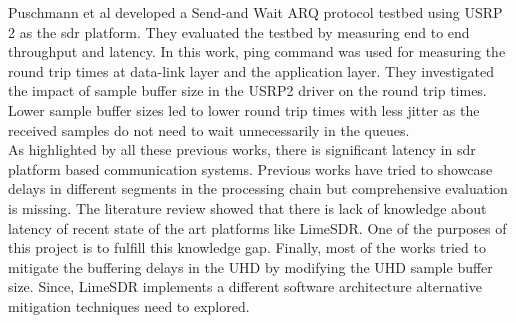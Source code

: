  
Puschmann et al \cite{puschmann_implementation_2011} developed a Send-and Wait \ac{ARQ} protocol  testbed using USRP 2 as the \ac{sdr} platform.
They evaluated the testbed by measuring end to end throughput and latency.
In this work, ping command was used for measuring the round trip times at data-link layer and the application layer.
They investigated the impact of sample buffer size in the USRP2 driver on the round trip times.
Lower sample buffer sizes led to lower round trip times with less jitter as the received samples do not need to wait unnecessarily in the queues.\\

As highlighted by all these previous works, there is significant latency in \ac{sdr} platform based communication systems.
Previous works have tried to showcase delays in different segments in the processing chain but comprehensive evaluation is missing.
The literature review showed that there is lack of knowledge about latency of recent state of the art platforms like LimeSDR.
One of the purposes of this project is to fulfill this knowledge gap.
Finally, most of the works tried to mitigate the buffering delays in the \ac{UHD} by modifying the UHD sample buffer size.
Since, LimeSDR implements a different software architecture alternative mitigation techniques need to explored. 


